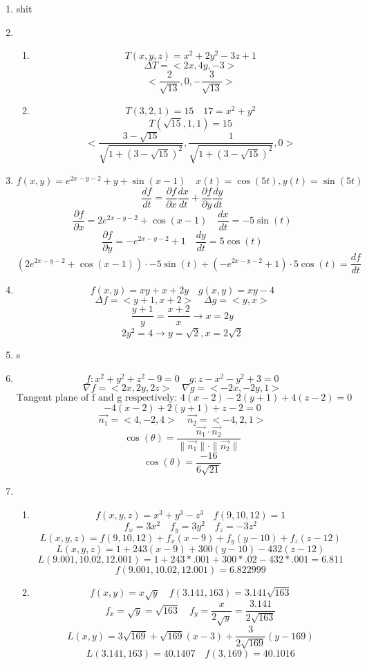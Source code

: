 \documentclass[12pt]{article}
\begin{document}
\maketitle \begin{enumerate}

\item shit

\item \begin{enumerate}
\item 
$$T(x, y, z) = x^2 +2y^2 - 3z + 1$$
$$\Delta T  = <2x, 4y, -3>$$
$$<\frac{2}{\sqrt{13}}, 0, -\frac{3}{\sqrt{13}}>$$
\item $$T(3, 2, 1) = 15 \quad 17 = x^2 + y^2$$
$$T(\sqrt{15},1, 1) = 15$$
$$<\frac{3-\sqrt{15}}{\sqrt{1+(3-\sqrt{15})^2}}, \frac{1}{\sqrt{1+(3-\sqrt{15})^2}}, 0>$$
\end{enumerate}

\item $$f(x, y) = e^{2x-y-2}+y+\sin(x-1) \quad x(t) = \cos (5t), y(t) = \sin (5t)$$
$$\frac{df}{dt} = \frac{\partial f}{\partial x} \frac{dx}{dt} + \frac{\partial f}{\partial y} \frac{dy}{dt}$$
$$\frac{\partial f}{\partial x} = 2e^{2x-y-2}+\cos(x-1) \quad \frac{dx}{dt} = -5\sin(t)$$
$$\frac{\partial f}{\partial y} = -e^{2x-y-2}+1 \quad \frac{dy}{dt} = 5\cos(t)$$
$$\left(2e^{2x-y-2}+\cos(x-1)\right)\cdot-5\sin(t) + \left(-e^{2x-y-2}+1\right)\cdot5\cos(t) = \frac{df}{dt}$$

\item $$f(x, y) = xy + x + 2y \quad g(x, y) = xy - 4$$
$$\Delta f = <y+1,x+2> \quad \Delta g = <y, x>$$
$$\frac{y+1}{y} = \frac{x+2}{x} \rightarrow x=2y$$
$$2y^2=4 \rightarrow y=\sqrt{2}, x = 2\sqrt{2}$$

\item s
\item $$f:x^2+y^2+z^2-9=0 \quad g:z-x^2-y^2+3=0$$
$$\nabla f = <2x,2y,2z> \quad \nabla g = <-2x,-2y,1>$$
$$\textrm{Tangent plane of f and g respectively: } 4(x-2)-2(y+1)+4(z-2)=0$$
$$-4(x-2)+2 (y+1)+z-2=0$$
$$\vec{n_1} = <4,-2,4> \quad \vec{n_2} = <-4, 2,1>$$
$$\cos(\theta) = \frac{\vec{n_1} \cdot \vec{n_2}}{\parallel \vec{n_1} \parallel \cdot \parallel \vec{n_2} \parallel}$$
$$\cos(\theta) = \frac{-16}{6\sqrt{21}}$$
\item \begin{enumerate}
\item $$f\left(x,y,z\right)=x^3+y^3-z^3 \quad f\left(9,10,12\right) = 1$$
$$f_x = 3x^2 \quad f_y = 3y^2 \quad f_z = -3z^2$$
$$L(x,y,z) = f(9,10,12) + f_x(x-9)+f_y(y-10)+f_z(z-12)$$
$$L(x,y,z) = 1 + 243(x-9)+300(y-10)-432(z-12)$$
$$L(9.001,10.02,12.001)=1+243*.001+300*.02-432*.001=6.811$$
$$f(9.001,10.02,12.001)=6.822999$$
\item $$f(x,y)=x\sqrt{y} \quad f(3.141,163)=3.141\sqrt{163}$$
$$f_x=\sqrt{y}=\sqrt{163} \quad f_y=\frac{x}{2\sqrt{y}}=\frac{3.141}{2\sqrt{163}}$$
$$L(x,y) = 3\sqrt{169} + \sqrt{169}(x-3) + \frac{3}{2\sqrt{169}}(y-169)$$
$$L(3.141,163)=40.1407 \quad f(3,169)=40.1016$$
\end{enumerate}


\end{enumerate}
\end{document}
